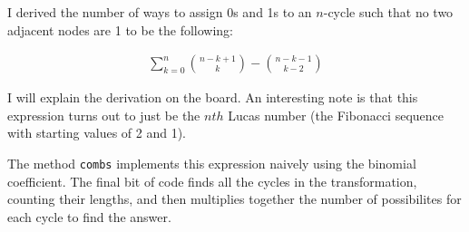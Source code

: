 \documentclass[11pt]{article}
\begin{document}
I derived the number of ways to assign 0s and 1s to an $n$-cycle such that no two adjacent nodes are 1 to be the following:

\begin{align*}
	\sum_{k=0}^{n} \binom{n - k + 1}{k} - \binom{n - k - 1}{k - 2}
\end{align*}

I will explain the derivation on the board. An interesting note is that this expression turns out to just be the $nth$ Lucas number (the Fibonacci sequence with starting values of 2 and 1).

The method \verb!combs! implements this expression naively using the binomial coefficient. The final bit of code finds all the cycles in the transformation, counting their lengths, and then multiplies together the number of possibilites for each cycle to find the answer. 
\end{document}
